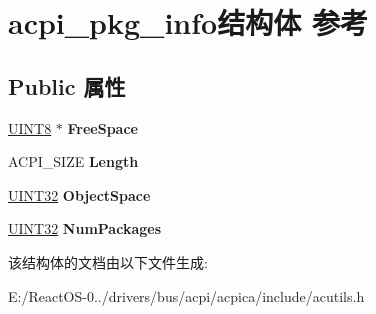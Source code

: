 \hypertarget{structacpi__pkg__info}{}\section{acpi\+\_\+pkg\+\_\+info结构体 参考}
\label{structacpi__pkg__info}
\subsection*{Public 属性}
\begin{DoxyCompactItemize}
\item 
\mbox{\label{structacpi__pkg__info_a93cc5968d8d8056a78a8313e1c675d7c}} 
\hyperlink{_processor_bind_8h_ab27e9918b538ce9d8ca692479b375b6a}{U\+I\+N\+T8} $\ast$ {\bfseries Free\+Space}
\item 
\mbox{\label{structacpi__pkg__info_ae03a8252721e146ececb6975c064439f}} 
A\+C\+P\+I\+\_\+\+S\+I\+ZE {\bfseries Length}
\item 
\mbox{\label{structacpi__pkg__info_af45498418272c5e0ac5b6f3f5b8973f6}} 
\hyperlink{_processor_bind_8h_ae1e6edbbc26d6fbc71a90190d0266018}{U\+I\+N\+T32} {\bfseries Object\+Space}
\item 
\mbox{\label{structacpi__pkg__info_a8cd9b6ba1215395a5c1133d175a0a777}} 
\hyperlink{_processor_bind_8h_ae1e6edbbc26d6fbc71a90190d0266018}{U\+I\+N\+T32} {\bfseries Num\+Packages}
\end{DoxyCompactItemize}


该结构体的文档由以下文件生成\+:\begin{DoxyCompactItemize}
\item 
E\+:/\+React\+O\+S-\/0../drivers/bus/acpi/acpica/include/acutils.\+h\end{DoxyCompactItemize}
